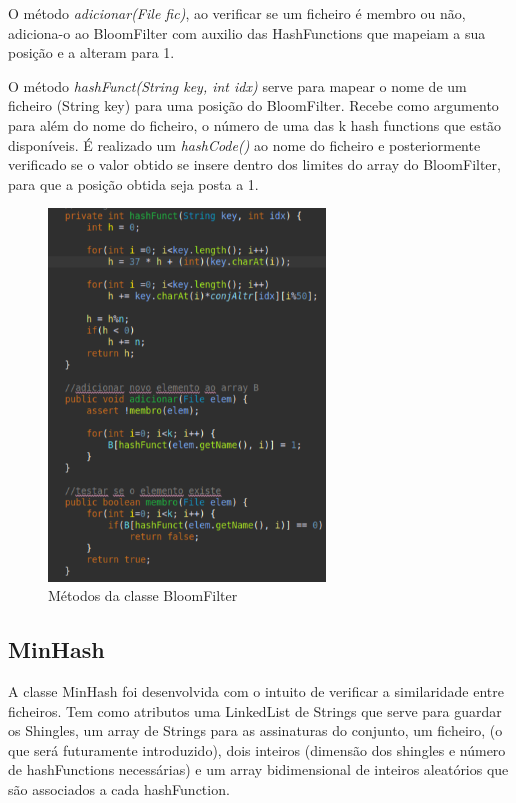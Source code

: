 \documentclass{report}
\begin{document}
O método {\itshape adicionar(File fic)}, ao verificar se um ficheiro é membro ou não, adiciona-o ao BloomFilter com auxilio das HashFunctions que mapeiam a sua posição e a alteram para 1.

O método {\itshape hashFunct(String key, int idx)} serve para mapear o nome de um ficheiro (String key) para uma posição do BloomFilter. Recebe como argumento para além do nome do ficheiro, o número de uma das k hash functions que estão disponíveis. É realizado um {\itshape hashCode()} ao nome do ficheiro e posteriormente verificado se o valor obtido se insere dentro dos limites do array do BloomFilter, para que a posição obtida seja posta a 1.

\begin{figure}[h]
\center %
\includegraphics[height=280pt]{methods.png}
\caption{Métodos da classe BloomFilter}
\label{fig:Fig21}
\end{figure}

\subsection{MinHash}

A classe MinHash foi desenvolvida com o intuito de verificar a similaridade entre ficheiros. Tem como atributos uma LinkedList de Strings que serve para guardar os Shingles, um array de Strings para as assinaturas do conjunto, um ficheiro, (o que será futuramente introduzido), dois inteiros (dimensão dos shingles e número de hashFunctions necessárias) e um array bidimensional de inteiros aleatórios que são associados a cada hashFunction.
\end{document}
